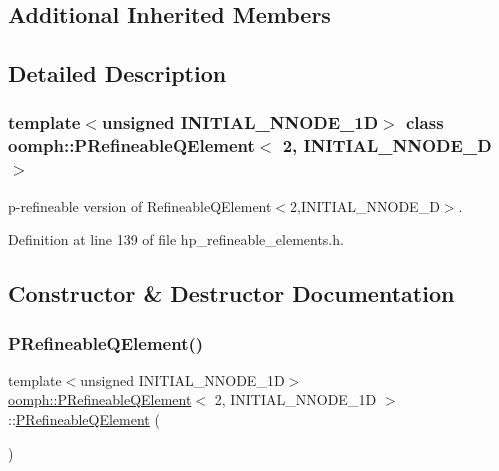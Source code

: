 \subsection*{Additional Inherited Members}


\subsection{Detailed Description}
\subsubsection*{template$<$unsigned I\+N\+I\+T\+I\+A\+L\+\_\+\+N\+N\+O\+D\+E\+\_\+1D$>$\newline
class oomph\+::\+P\+Refineable\+Q\+Element$<$ 2, I\+N\+I\+T\+I\+A\+L\+\_\+\+N\+N\+O\+D\+E\+\_\+D $>$}

p-\/refineable version of Refineable\+Q\+Element$<$2,\+I\+N\+I\+T\+I\+A\+L\+\_\+\+N\+N\+O\+D\+E\+\_\+D$>$. 

Definition at line 139 of file hp\+\_\+refineable\+\_\+elements.\+h.



\subsection{Constructor \& Destructor Documentation}
\mbox{\label{classoomph_1_1PRefineableQElement_3_012_00_01INITIAL__NNODE__1D_01_4_ab944f5fb0b3e712d696ea2c33ac09a16}} 
\subsubsection{\texorpdfstring{P\+Refineable\+Q\+Element()}{PRefineableQElement()}}
{\footnotesize\ttfamily template$<$unsigned I\+N\+I\+T\+I\+A\+L\+\_\+\+N\+N\+O\+D\+E\+\_\+1D$>$ \\
\hyperlink{classoomph_1_1PRefineableQElement}{oomph\+::\+P\+Refineable\+Q\+Element}$<$ 2, I\+N\+I\+T\+I\+A\+L\+\_\+\+N\+N\+O\+D\+E\+\_\+1D $>$\+::\hyperlink{classoomph_1_1PRefineableQElement}{P\+Refineable\+Q\+Element} (\begin{DoxyParamCaption}{ }\end{DoxyParamCaption})\hspace{0.3cm}{\ttfamily [inline]}}



